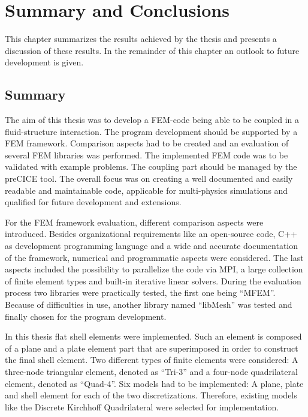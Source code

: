 \section{Summary and Conclusions}
 This chapter summarizes the results achieved by the thesis and presents a discussion of these results. In the remainder of this chapter an outlook to future development is given.
 
 
 \subsection{Summary}
  The aim of this thesis was to develop a FEM-code being able to be coupled in a fluid-structure interaction. The program development should be supported by a FEM framework. Comparison aspects had to be created and an evaluation of several FEM libraries was performed. The implemented FEM code was to be validated with example problems. The coupling part should be managed by the preCICE tool. The overall focus was on creating a well documented and easily readable and maintainable code, applicable for multi-physics simulations and qualified for future development and extensions.

  For the FEM framework evaluation, different comparison aspects were introduced. Besides organizational requirements like an open-source code, C++ as development programming language and a wide and accurate documentation of the framework, numerical and programmatic aspects were considered. The last aspects included the possibility to parallelize the code via MPI, a large collection of finite element types and built-in iterative linear solvers. During the evaluation process two libraries were practically tested, the first one being ``MFEM''. Because of difficulties in use, another library named ``libMesh'' was tested and finally chosen for the program development.  

  In this thesis flat shell elements were implemented. Such an element is composed of a plane and a plate element part that are superimposed in order to construct the final shell element. Two different types of finite elements were considered: A three-node triangular element, denoted as ``Tri-3'' and a four-node quadrilateral element, denoted as ``Quad-4''. Six models had to be implemented: A plane, plate and shell element for each of the two discretizations. Therefore, existing models like the Discrete Kirchhoff Quadrilateral were selected for implementation.

